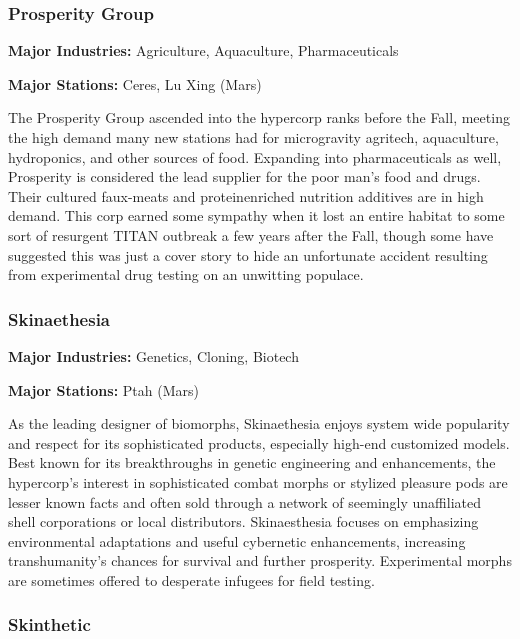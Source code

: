 \subsubsection{Prosperity Group} \label{sec:prosperity-group} 

\textbf{Major Industries:} Agriculture, Aquaculture, Pharmaceuticals 

\textbf{Major Stations:} Ceres, Lu Xing (Mars) 

The Prosperity Group ascended into the hypercorp ranks before the Fall, meeting the high demand many new stations had for microgravity agritech, aquaculture, hydroponics, and other sources of food. Expanding into pharmaceuticals as well, Prosperity is considered the lead supplier for the poor man's food and drugs. Their cultured faux-meats and proteinenriched nutrition additives are in high demand. This corp earned some sympathy when it lost an entire habitat to some sort of resurgent TITAN outbreak a few years after the Fall, though some have suggested this was just a cover story to hide an unfortunate accident resulting from experimental drug testing on an unwitting populace. 

\subsubsection{Skinaethesia} \label{sec:skinaethesia} 

\textbf{Major Industries:} Genetics, Cloning, Biotech 

\textbf{Major Stations:} Ptah (Mars) 

As the leading designer of biomorphs, Skinaethesia enjoys system wide popularity and respect for its sophisticated products, especially high-end customized models. Best known for its breakthroughs in genetic engineering and enhancements, the hypercorp's interest in sophisticated combat morphs or stylized pleasure pods are lesser known facts and often sold through a network of seemingly unaffiliated shell corporations or local distributors. Skinaesthesia focuses on emphasizing environmental adaptations and useful cybernetic enhancements, increasing transhumanity's chances for survival and further prosperity. Experimental morphs are sometimes offered to desperate infugees for field testing. 

\subsubsection{Skinthetic} \label{sec:skinthetic} 

